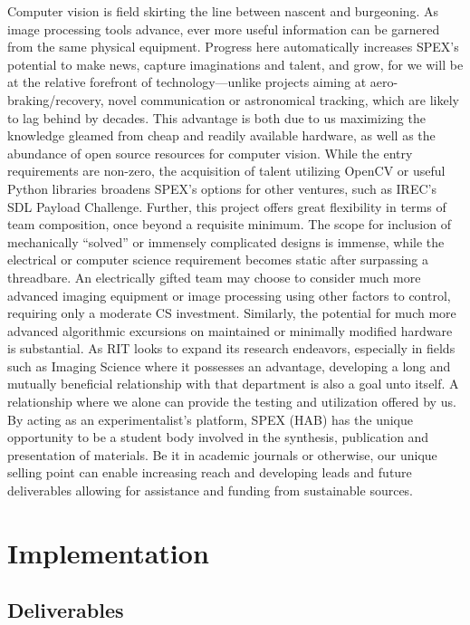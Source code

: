 \documentclass[conference]{IEEEtran} %
\begin{document}
Computer vision is field skirting the line between nascent and burgeoning. 
As image processing tools advance, ever more useful information can be garnered from the same physical equipment. 
Progress here automatically increases SPEX's potential to make news, capture imaginations and talent, and grow, for we will be at the relative forefront of technology---unlike projects aiming at aero-braking/recovery, novel communication or astronomical tracking, which are likely to lag behind by decades. 
This advantage is both due to us maximizing the knowledge gleamed from cheap and readily available hardware, as well as the abundance of open source resources for computer vision. 
While the entry requirements are non-zero, the acquisition of talent utilizing OpenCV or useful Python libraries broadens SPEX's options for other ventures, such as IREC's SDL Payload Challenge. 
Further, this project offers great flexibility in terms of team composition, once beyond a requisite minimum. 
The scope for inclusion of mechanically ``solved'' or immensely complicated designs is immense, while the electrical or computer science requirement becomes static after surpassing a threadbare. 
An electrically gifted team may choose to consider much more advanced imaging equipment or image processing using other factors to control, requiring only a moderate CS investment. 
Similarly, the potential for much more advanced algorithmic excursions on maintained or minimally modified hardware is substantial. 
As RIT looks to expand its research endeavors, especially in fields such as Imaging Science where it possesses an advantage, developing a long and mutually beneficial relationship with that department is also a goal unto itself. 
A relationship where we alone can provide the testing and utilization offered by us. 
By acting as an experimentalist's platform, SPEX (HAB) has the unique opportunity to be a student body involved in the synthesis, publication and presentation of materials. 
Be it in academic journals or otherwise, our unique selling point can enable increasing reach and developing leads and future deliverables allowing for assistance and funding from sustainable sources.

\section{Implementation}
\label{implementation}
\subsection{Deliverables}
\end{document}
